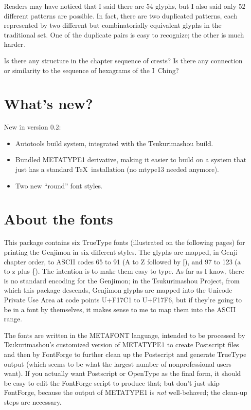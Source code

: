 \documentclass{mitsuba}
\begin{document}
Readers may have noticed that I said there are 54 glyphs, but I also said
only 52 different patterns are possible.  In fact, there are two duplicated
patterns, each represented by two different but combinatorially equivalent
glyphs in the traditional set.  One of the duplicate pairs is easy to
recognize; the other is much harder.

Is there any structure in the chapter sequence of crests?  Is there any
connection or similarity to the sequence of hexagrams of the I~Ching?

\section{What's new?}

New in version 0.2:
\begin{itemize}
\item Autotools build system, integrated with the Tsukurimashou build.
\item Bundled METATYPE1 derivative, making it easier to build on a system
that just has a standard \TeX\ installation (no mtype13 needed anymore).
\item Two new ``round'' font styles.
\end{itemize}

\section{About the fonts}

This package contains six TrueType fonts (illustrated on the following
pages) for printing the Genjimon in six different styles.  The glyphs are
mapped, in Genji chapter order, to ASCII codes 65 to 91 (A to Z followed by
[), and 97 to 123 (a to z plus \{).  The intention is to make them easy to
type.  As far as I know, there is no standard encoding for the Genjimon; in
the Tsukurimashou Project, from which this package descends, Genjimon glyphs
are mapped into the Unicode Private Use Area at code points U+F17C1 to
U+F17F6, but if they're going to be in a font by themselves, it makes sense
to me to map them into the ASCII range.

The fonts are written in the METAFONT language, intended to be processed by
Tsukurimashou's customized version of METATYPE1 to create Postscript files
and then by FontForge to further clean up the Postscript and generate
TrueType output (which seems to be what the largest number of
nonprofessional users want).  If you actually want Postscript or OpenType as
the final form, it should be easy to edit the FontForge script to produce
that; but don't just skip FontForge, because the output of METATYPE1 is
\emph{not} well-behaved; the clean-up steps are necessary.
\end{document}
